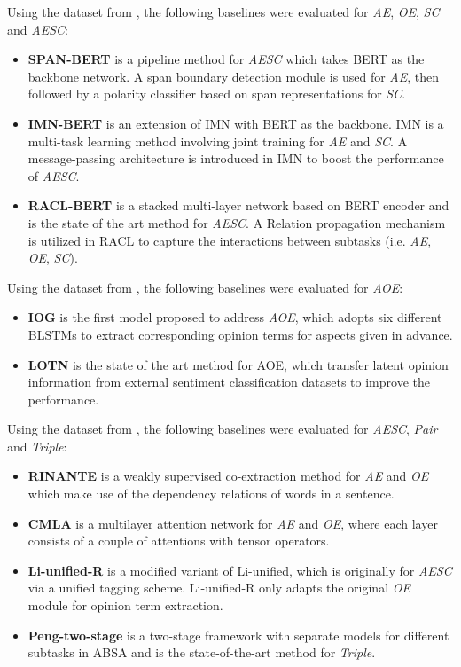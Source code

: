 \documentclass[letterpaper]{article} \usepackage{aaai21}  \usepackage{times}  \usepackage{helvet} \usepackage{courier}  \usepackage[hyphens]{url}  \usepackage{graphicx} \urlstyle{rm} \def\UrlFont{\rm}  \usepackage{natbib}  \usepackage{caption}
\begin{document}
Using the dataset from \cite{DBLP:conf/aaai/WangPDX17}, the following baselines were evaluated for \emph{AE}, \emph{OE}, \emph{SC} and \emph{AESC}:
\begin{itemize}
    \item \textbf{SPAN-BERT} \cite{hu-etal-2019-open} is a pipeline method for \emph{AESC} which takes BERT as the backbone network. A span boundary detection module is  used for \emph{AE},  then followed by a polarity classifier based on span representations for \emph{SC}.
    \item \textbf{IMN-BERT} \cite{he-etal-2019-interactive} is an extension  of IMN \cite{he-etal-2019-interactive} with BERT as the backbone. IMN is a multi-task learning method involving joint training for \emph{AE} and \emph{SC}. A message-passing architecture is introduced in IMN to boost the performance of \emph{AESC}.
    \item \textbf{RACL-BERT} \cite{chen-qian-2020-relation}  is a stacked multi-layer network based on BERT encoder and is the state of the art method for \emph{AESC}. A Relation propagation mechanism is utilized in RACL to capture the interactions between subtasks (i.e. \emph{AE}, \emph{OE}, \emph{SC}).
\end{itemize}
Using the dataset from \cite{fan2019target}, the following baselines were evaluated for \emph{AOE}:
\begin{itemize}
    \item \textbf{IOG} \cite{fan2019target} is the first model proposed to address \emph{AOE}, which adopts six different BLSTMs to extract corresponding opinion terms for aspects given in advance. 
    \item \textbf{LOTN} \cite{DBLP:conf/aaai/WuZDHC20} is the state of the art method for AOE, which transfer latent opinion information from external  sentiment classification datasets to improve the performance. 
\end{itemize}
Using the dataset from \cite{peng2020knowing}, the following baselines were evaluated for \emph{AESC}, \emph{Pair} and \emph{Triple}:
\begin{itemize}
    \item \textbf{RINANTE} \cite{dai-song-2019-neural} is a weakly supervised co-extraction method for \emph{AE} and \emph{OE} which make use of the dependency relations of words in a sentence. 
    \item \textbf{CMLA} \cite{DBLP:conf/aaai/WangPDX17} is a multilayer attention network for \emph{AE} and \emph{OE}, where each layer consists of a couple of attentions with tensor operators.
    \item \textbf{Li-unified-R} \cite{peng2020knowing} is a modified variant of Li-unified\cite{li2019unified}, which is originally for \emph{AESC} via a unified tagging scheme.  Li-unified-R only adapts the original \emph{OE} module for opinion term extraction.
    \item \textbf{Peng-two-stage} \cite{peng2020knowing} is a two-stage framework with separate models for different subtasks in ABSA and is the state-of-the-art method for \emph{Triple}.
\end{itemize}
\end{document}
